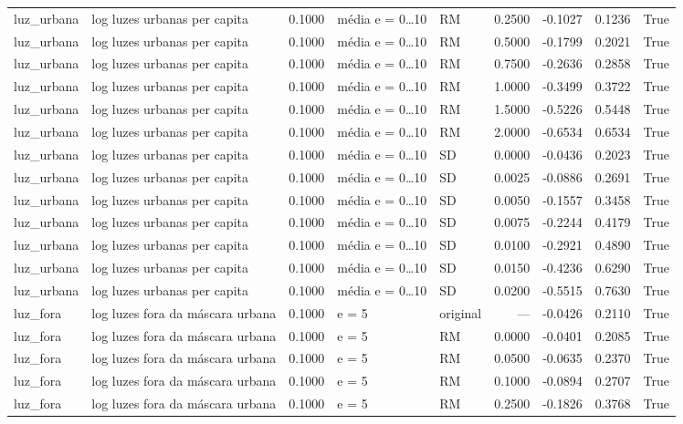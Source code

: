 \begin{table}
{\begin{tabular}{llrllrrrr}
luz\_urbana & log luzes urbanas per capita & 0.1000 & média e = 0…10 & RM & 0.2500 & -0.1027 & 0.1236 & True \\
luz\_urbana & log luzes urbanas per capita & 0.1000 & média e = 0…10 & RM & 0.5000 & -0.1799 & 0.2021 & True \\
luz\_urbana & log luzes urbanas per capita & 0.1000 & média e = 0…10 & RM & 0.7500 & -0.2636 & 0.2858 & True \\
luz\_urbana & log luzes urbanas per capita & 0.1000 & média e = 0…10 & RM & 1.0000 & -0.3499 & 0.3722 & True \\
luz\_urbana & log luzes urbanas per capita & 0.1000 & média e = 0…10 & RM & 1.5000 & -0.5226 & 0.5448 & True \\
luz\_urbana & log luzes urbanas per capita & 0.1000 & média e = 0…10 & RM & 2.0000 & -0.6534 & 0.6534 & True \\
luz\_urbana & log luzes urbanas per capita & 0.1000 & média e = 0…10 & SD & 0.0000 & -0.0436 & 0.2023 & True \\
luz\_urbana & log luzes urbanas per capita & 0.1000 & média e = 0…10 & SD & 0.0025 & -0.0886 & 0.2691 & True \\
luz\_urbana & log luzes urbanas per capita & 0.1000 & média e = 0…10 & SD & 0.0050 & -0.1557 & 0.3458 & True \\
luz\_urbana & log luzes urbanas per capita & 0.1000 & média e = 0…10 & SD & 0.0075 & -0.2244 & 0.4179 & True \\
luz\_urbana & log luzes urbanas per capita & 0.1000 & média e = 0…10 & SD & 0.0100 & -0.2921 & 0.4890 & True \\
luz\_urbana & log luzes urbanas per capita & 0.1000 & média e = 0…10 & SD & 0.0150 & -0.4236 & 0.6290 & True \\
luz\_urbana & log luzes urbanas per capita & 0.1000 & média e = 0…10 & SD & 0.0200 & -0.5515 & 0.7630 & True \\
luz\_fora & log luzes fora da máscara urbana & 0.1000 & e = 5 & original & — & -0.0426 & 0.2110 & True \\
luz\_fora & log luzes fora da máscara urbana & 0.1000 & e = 5 & RM & 0.0000 & -0.0401 & 0.2085 & True \\
luz\_fora & log luzes fora da máscara urbana & 0.1000 & e = 5 & RM & 0.0500 & -0.0635 & 0.2370 & True \\
luz\_fora & log luzes fora da máscara urbana & 0.1000 & e = 5 & RM & 0.1000 & -0.0894 & 0.2707 & True \\
luz\_fora & log luzes fora da máscara urbana & 0.1000 & e = 5 & RM & 0.2500 & -0.1826 & 0.3768 & True \\

\end{tabular}}
\end{table}
